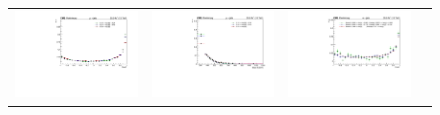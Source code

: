 \begin{figure}[htp]
\begin{tabular}{cccc}
\hspace{-0.5cm}
\includegraphics[scale=0.21]{fig/chapt7/qcd/qcd_mu_ch/cosine_3region_compare.pdf}
& \hspace{-0.95cm} \includegraphics[scale=0.21]{fig/chapt7/qcd/qcd_mu_ch/ttbar_m_3region_compare.pdf}
& \hspace{-0.95cm} \includegraphics[scale=0.21]{fig/chapt7/qcd/qcd_e_ch/cosine_3region_compare.pdf}

\end{tabular}
\end{figure}
